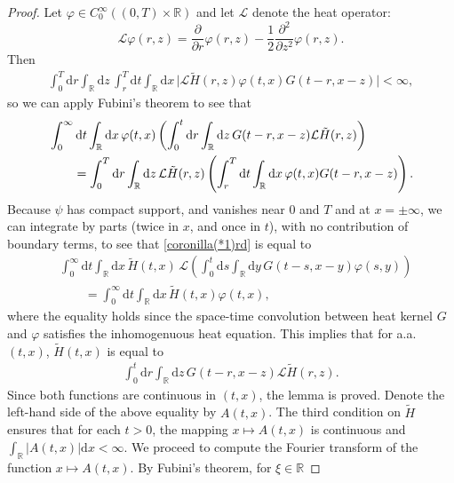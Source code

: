 \documentclass[12pt,a4paper]{article}
\newcommand{\R}{{\mathbb{R}}}
\newcommand{\LL}{\mathcal{L}}
\renewcommand{\d}{\mathrm{d}}
\newcommand{\<}{\langle}
\renewcommand{\>}{\rangle}
\begin{document}
\begin{proof}
Let $\varphi \in C_0^\infty((0, T) \times \R)$ and let $\LL$ denote the heat operator: 
\[
     \LL \varphi (r, z)= \frac{\partial }{\partial r} \varphi(r, z) -\frac12\frac{\partial^2}{\partial z^2} \varphi(r, z). 
\]
Then
\begin{align*}%
    \int_0^T \d r \int_\R \d z\,  \int_r^T \d t \int_\R \d x\, \vert \LL \tilde H(r,z) \varphi(t,x) G(t-r, x-z) \vert < \infty,
\end{align*}
so we can apply Fubini's theorem to see that
\begin{align}
\label{coronilla(*1)rd}
 & \int_0^\infty \d t \int_\R \d x\, \varphi(t,x) \left(\int_0^t \d r \int_\R \d z\, G(t-r, x-z) \LL \tilde H(r,z)\right)  \notag\\
 &\qquad = \int_0^T \d r \int_\R \d z\,  \LL \tilde H(r,z) \left(\int_r^T \d t \int_\R \d x\, \varphi(t,x) G(t-r, x-z) \right).
  \end{align}   %
Because $\psi$ has compact support, and vanishes near $0$ and $T$ and at $x = \pm \infty$, we can integrate by parts (twice in $x$, and once in $t$), with no contribution of boundary terms, to see that \eqref{coronilla(*1)rd} is equal to
\begin{align*}
    &\int_0^\infty \d t \int_\R \d x\,  \tilde H(t,x)\, \LL \left(\int_0^t \d s \int_\R \d y\, G(t-s, x-y) \varphi(s,y)\right)\\
    &\qquad =  \int_0^\infty \d t \int_\R \d x\, \tilde H(t,x) \varphi(t,x),
    \end{align*}
where the equality holds since the space-time convolution between heat kernel $G$ and $\varphi$ satisfies the inhomogenuous heat equation. This implies that for a.a.~$(t, x)$, $\tilde H(t, x)$ is equal to 
\begin{align*}%
    \int_0^t \d r \int_\R \d z\,  G(t-r, x-z) \LL \tilde H(r,z) .
\end{align*}
Since both functions are continuous in $(t, x)$, the lemma is proved.
\iffalse%
Denote the left-hand side of the above equality by $A(t,x)$. The third condition on $\tilde{H}$ ensures that for each $t>0$, the mapping $x\mapsto A(t,x)$ is continuous and $\int_\R|A(t,x)|\d x<\infty$. We proceed to compute the Fourier transform of the function $x\mapsto A(t,x)$. By Fubini's theorem, for $\xi\in \R$

\end{proof}
\end{document}
